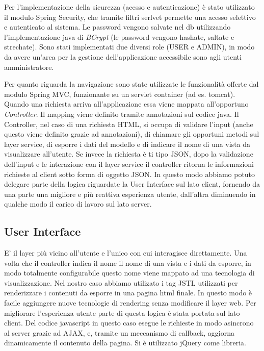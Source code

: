 Per l'implementazione della sicurezza (acesso e autenticazione) è
stato utilizzato il modulo Spring Security, che tramite filtri serlvet
permette una acesso selettivo e autenticato al sistema. Le password
vengono salvate nel db utilizzando l'implementazione java di
\emph{BCrypt} (le password vengono hashate, saltate e strechate). Sono
stati implementati due diversi role (USER e ADMIN), in modo da avere
un'area per la gestione dell'applicazione accessibile sono agli utenti
amministratore.


Per quanto riguarda la navigazione sono state utilizzate le
funzionalità offerte dal modulo Spring MVC, funzionante su un servlet
container (ad es. tomcat). Quando una richiesta arriva
all'applicazione essa viene mappata all'opportuno
\emph{Controller}. Il mapping viene definito tramite annotazioni sul
codice java. Il Controller, nel caso di una richiesta HTML, si occupa
di validare l'input (anche questo viene definito grazie ad
annotazioni), di chiamare gli opportuni metodi sul layer service, di
esporre i dati del modello e di indicare il nome di una vista da
visualizzare all'utente. Se invece la richiesta è ti tipo JSON, dopo
la validazione dell'input e le interazione con il layer service il
controller ritorna le informazioni richieste al client sotto forma di
oggetto JSON. In questo modo abbiamo potuto delegare parte della
logica riguardate la User Interface sul lato client, fornendo da una
parte una migliore e più reattiva esperienza utente, dall'altra
diminuendo in qualche modo il carico di lavoro sul lato server.

\subsection{User Interface}

E' il layer più vicino all'utente e l'unico con cui interagisce
direttamente. Una volta che il controller indica il nome il nome di
una vista e i dati da esporre, in modo totalmente configurabile questo
nome viene mappato ad una tecnologia di visualizzazione. Nel nostro
caso abbiamo utilizato i tag JSTL utilizzati per renderizzare i
contenuti da esporre in una pagina html finale. In questo modo è
facile aggiungere nuove tecnologie di rendering senza modificare il
layer web.  Per migliorare l'esperienza utente parte di questa logica
è stata portata sul lato client. Del codice javascript in questo caso
esegue le richieste in modo asincrono al server grazie ad AJAX, e, tramite
un meccanismo di callback, aggiorna dinamicamente il contenuto della
pagina. Si è utilizzato jQuery come libreria.


